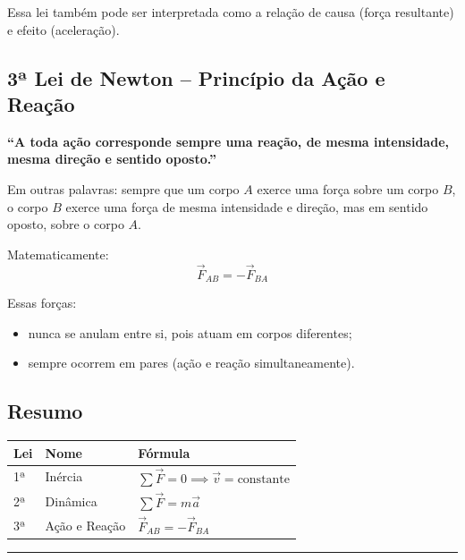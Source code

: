 \documentclass[a4paper,12pt]{article}
\begin{document}
Essa lei também pode ser interpretada como a relação de causa (força resultante) e efeito (aceleração).

\subsection*{3ª Lei de Newton – Princípio da Ação e Reação}

\textbf{``A toda ação corresponde sempre uma reação, de mesma intensidade, mesma direção e sentido oposto.''}

Em outras palavras: sempre que um corpo \( A \) exerce uma força sobre um corpo \( B \), o corpo \( B \) exerce uma força de mesma intensidade e direção, mas em sentido oposto, sobre o corpo \( A \).

Matematicamente:
\[
\vec{F}_{AB} = -\vec{F}_{BA}
\]

Essas forças:
\begin{itemize}
    \item nunca se anulam entre si, pois atuam em corpos diferentes;
    \item sempre ocorrem em pares (ação e reação simultaneamente).
\end{itemize}

\subsection*{Resumo}

\begin{center}
\begin{tabular}{lll}
\toprule
\textbf{Lei} & \textbf{Nome} & \textbf{Fórmula} \\
\midrule
1ª & Inércia & \( \sum \vec{F} = 0 \implies \vec{v} = \text{constante} \) \\
2ª & Dinâmica & \( \sum \vec{F} = m \vec{a} \) \\
3ª & Ação e Reação & \( \vec{F}_{AB} = -\vec{F}_{BA} \) \\
\bottomrule
\end{tabular}
\end{center}

\noindent\rule{\linewidth}{0.6pt}\\
\end{document}
